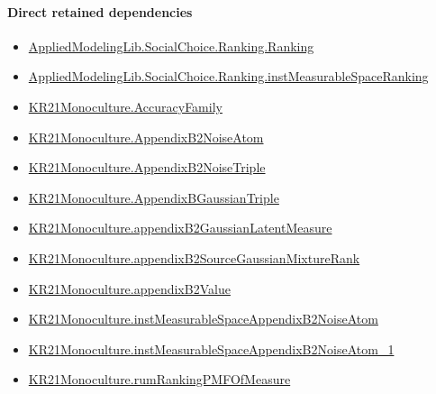 \documentclass[10pt]{article}
\begin{document}
\paragraph{Direct retained dependencies}
\begin{itemize}\raggedright
\item \hyperlink{library-prerequisite-5cde54446d1ae021}{Applied\allowbreak{}Modeling\allowbreak{}Lib.\allowbreak{}Social\allowbreak{}Choice.\allowbreak{}Ranking.\allowbreak{}Ranking}
\item \hyperlink{governing-declaration-30ca9c740ef703ec}{Applied\allowbreak{}Modeling\allowbreak{}Lib.\allowbreak{}Social\allowbreak{}Choice.\allowbreak{}Ranking.\allowbreak{}inst\allowbreak{}Measurable\allowbreak{}Space\allowbreak{}Ranking}
\item \hyperlink{paper-prerequisite-a1353b2b1b6f0303}{KR21\allowbreak{}Monoculture.\allowbreak{}Accuracy\allowbreak{}Family}
\item \hyperlink{governing-declaration-a251de733d2f986a}{KR21\allowbreak{}Monoculture.\allowbreak{}Appendix\allowbreak{}B2\allowbreak{}Noise\allowbreak{}Atom}
\item \hyperlink{governing-declaration-5e2e57dad411ac3e}{KR21\allowbreak{}Monoculture.\allowbreak{}Appendix\allowbreak{}B2\allowbreak{}Noise\allowbreak{}Triple}
\item \hyperlink{governing-declaration-4ebcacb6f266705a}{KR21\allowbreak{}Monoculture.\allowbreak{}Appendix\allowbreak{}B\allowbreak{}Gaussian\allowbreak{}Triple}
\item \hyperlink{governing-declaration-e543890fa54a6b76}{KR21\allowbreak{}Monoculture.\allowbreak{}appendix\allowbreak{}B2\allowbreak{}Gaussian\allowbreak{}Latent\allowbreak{}Measure}
\item \hyperlink{governing-declaration-90a6793e2b61850e}{KR21\allowbreak{}Monoculture.\allowbreak{}appendix\allowbreak{}B2\allowbreak{}Source\allowbreak{}Gaussian\allowbreak{}Mixture\allowbreak{}Rank}
\item \hyperlink{governing-declaration-302704452f418635}{KR21\allowbreak{}Monoculture.\allowbreak{}appendix\allowbreak{}B2\allowbreak{}Value}
\item \hyperlink{governing-declaration-7b2eea0fb1b02be5}{KR21\allowbreak{}Monoculture.\allowbreak{}inst\allowbreak{}Measurable\allowbreak{}Space\allowbreak{}Appendix\allowbreak{}B2\allowbreak{}Noise\allowbreak{}Atom}
\item \hyperlink{governing-declaration-118ab3120410233a}{KR21\allowbreak{}Monoculture.\allowbreak{}inst\allowbreak{}Measurable\allowbreak{}Space\allowbreak{}Appendix\allowbreak{}B2\allowbreak{}Noise\allowbreak{}Atom\_\allowbreak{}1}
\item \hyperlink{governing-declaration-ba11126c32f3deba}{KR21\allowbreak{}Monoculture.\allowbreak{}rum\allowbreak{}Ranking\allowbreak{}PMF\allowbreak{}Of\allowbreak{}Measure}
\end{itemize}
\hypertarget{governing-declaration-47f49a4f0bf913e0}{}
\end{document}
